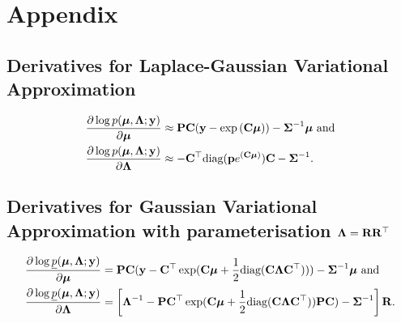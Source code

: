 			\section{Appendix}
			\subsection{Derivatives for Laplace-Gaussian Variational Approximation}
			\label{sec:appendix_derivatives_laplace}
			\begin{align*}
				\frac{\partial \log p({\boldsymbol \mu}, {\boldsymbol \Lambda}; {\bf y})}{\partial {\boldsymbol\mu}}     & \approx {\bf P} {\bf C} ({\bf y} - \exp{({\bf C}{\boldsymbol\mu})}) - {\boldsymbol \Sigma}^{-1} {\boldsymbol \mu} \text{ and} \\
				\frac{\partial \log p({\boldsymbol \mu}, {\boldsymbol \Lambda}; {\bf y})}{\partial {\boldsymbol\Lambda}} & \approx - {\bf C}^\top \text{diag}({\bf p} e^{({\bf C} {\boldsymbol \mu})}) {\bf C} - {\boldsymbol \Sigma}^{-1}.   
			\end{align*}
					
			\subsection{Derivatives for Gaussian Variational Approximation with parameterisation ${\boldsymbol \Lambda} = {\bf R} {\bf R}^\top$}
			\label{sec:appendix_derivatives_gva}
			\begin{align*}
				\frac{\partial \log \underline{p}({\boldsymbol \mu}, {\boldsymbol \Lambda}; {\bf y})}{\partial {\boldsymbol\mu}}     & = {\bf P} {\bf C} ({\bf y} - {\bf C}^\top \exp({\bf C} {\boldsymbol \mu} + \frac{1}{2} \text{diag}{({\bf C}{\boldsymbol\Lambda}{\bf C}^\top)})) - {\boldsymbol \Sigma}^{-1} {\boldsymbol \mu} \text{ and}                \\
				\frac{\partial \log \underline{p}({\boldsymbol \mu}, {\boldsymbol \Lambda}; {\bf y})}{\partial {\boldsymbol\Lambda}} & = \left [{\boldsymbol \Lambda}^{-1} - {\bf P} {\bf C}^\top \exp({\bf C} {\boldsymbol \mu} + \frac{1}{2} \text{diag}({\bf C} {\boldsymbol \Lambda} {\bf C}^\top)) {\bf P} {\bf C}) - {\boldsymbol \Sigma}^{-1} \right ] {\bf R}. 
			\end{align*}

